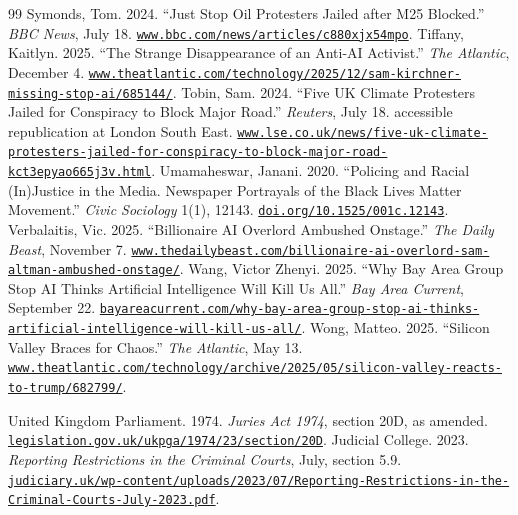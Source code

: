 \documentclass[11pt]{article}
\begin{document}
\begin{thebibliography}{99}
 Symonds, Tom. 2024. ``Just Stop Oil Protesters Jailed after M25 Blocked.'' \emph{BBC News}, July 18. \href{https://www.bbc.com/news/articles/c880xjx54mpo}{\nolinkurl{www.bbc.com/news/articles/c880xjx54mpo}}.
 Tiffany, Kaitlyn. 2025. ``The Strange Disappearance of an Anti-AI Activist.'' \emph{The Atlantic}, December 4. \href{https://www.theatlantic.com/technology/2025/12/sam-kirchner-missing-stop-ai/685144/}{\nolinkurl{www.theatlantic.com/technology/2025/12/sam-kirchner-missing-stop-ai/685144/}}.
 Tobin, Sam. 2024. ``Five UK Climate Protesters Jailed for Conspiracy to Block Major Road.'' \emph{Reuters}, July 18. accessible republication at London South East. \href{https://www.lse.co.uk/news/five-uk-climate-protesters-jailed-for-conspiracy-to-block-major-road-kct3epyao665j3v.html}{\nolinkurl{www.lse.co.uk/news/five-uk-climate-protesters-jailed-for-conspiracy-to-block-major-road-kct3epyao665j3v.html}}.
 Umamaheswar, Janani. 2020. ``Policing and Racial (In)Justice in the Media. Newspaper Portrayals of the Black Lives Matter Movement.'' \emph{Civic Sociology} 1(1), 12143. \href{https://doi.org/10.1525/001c.12143}{\nolinkurl{doi.org/10.1525/001c.12143}}.
 Verbalaitis, Vic. 2025. ``Billionaire AI Overlord Ambushed Onstage.'' \emph{The Daily Beast}, November 7. \href{https://www.thedailybeast.com/billionaire-ai-overlord-sam-altman-ambushed-onstage/}{\nolinkurl{www.thedailybeast.com/billionaire-ai-overlord-sam-altman-ambushed-onstage/}}.
 Wang, Victor Zhenyi. 2025. ``Why Bay Area Group Stop AI Thinks Artificial Intelligence Will Kill Us All.'' \emph{Bay Area Current}, September 22. \href{https://bayareacurrent.com/why-bay-area-group-stop-ai-thinks-artificial-intelligence-will-kill-us-all/}{\nolinkurl{bayareacurrent.com/why-bay-area-group-stop-ai-thinks-artificial-intelligence-will-kill-us-all/}}.
 Wong, Matteo. 2025. ``Silicon Valley Braces for Chaos.'' \emph{The Atlantic}, May 13. \href{https://www.theatlantic.com/technology/archive/2025/05/silicon-valley-reacts-to-trump/682799/}{\nolinkurl{www.theatlantic.com/technology/archive/2025/05/silicon-valley-reacts-to-trump/682799/}}.

 United Kingdom Parliament. 1974. \emph{Juries Act 1974}, section 20D, as amended. \href{https://www.legislation.gov.uk/ukpga/1974/23/section/20D}{\nolinkurl{legislation.gov.uk/ukpga/1974/23/section/20D}}.
 Judicial College. 2023. \emph{Reporting Restrictions in the Criminal Courts}, July, section 5.9. \href{https://www.judiciary.uk/wp-content/uploads/2023/07/Reporting-Restrictions-in-the-Criminal-Courts-July-2023.pdf}{\nolinkurl{judiciary.uk/wp-content/uploads/2023/07/Reporting-Restrictions-in-the-Criminal-Courts-July-2023.pdf}}.
\end{thebibliography}
\clearpage
\appendix
\end{document}

